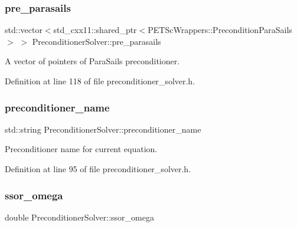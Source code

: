 \subsubsection{\texorpdfstring{pre\+\_\+parasails}{pre\_parasails}}
{\footnotesize\ttfamily std\+::vector$<$std\+\_\+cxx11\+::shared\+\_\+ptr$<$P\+E\+T\+Sc\+Wrappers\+::\+Precondition\+Para\+Sails$>$ $>$ Preconditioner\+Solver\+::pre\+\_\+parasails\hspace{0.3cm}{\ttfamily [private]}}



A vector of pointers of Para\+Sails preconditioner. 



Definition at line 118 of file preconditioner\+\_\+solver.\+h.

\mbox{\label{class_preconditioner_solver_a2d8afd11d073e87487da0442486c3e48}} 
\subsubsection{\texorpdfstring{preconditioner\+\_\+name}{preconditioner\_name}}
{\footnotesize\ttfamily std\+::string Preconditioner\+Solver\+::preconditioner\+\_\+name\hspace{0.3cm}{\ttfamily [private]}}



Preconditioner name for current equation. 



Definition at line 95 of file preconditioner\+\_\+solver.\+h.

\mbox{\label{class_preconditioner_solver_ab9548e7699e82a2b006db283c59e4a80}} 
\subsubsection{\texorpdfstring{ssor\+\_\+omega}{ssor\_omega}}
{\footnotesize\ttfamily double Preconditioner\+Solver\+::ssor\+\_\+omega\hspace{0.3cm}{\ttfamily [private]}}



